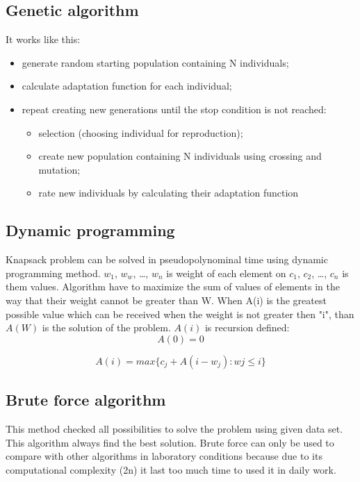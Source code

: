 \documentclass[conference,compsoc]{IEEEtran}
\begin{document}
\subsection{Genetic algorithm}
It works like this:
\begin{itemize}
\item generate random starting population containing N individuals;
\item calculate adaptation function for each individual;
\item repeat creating new generations until the stop condition is not reached:
	\begin{itemize}
	\item selection (choosing individual for reproduction);
	\item create new population containing N individuals 					using crossing and mutation;
	\item rate new individuals by calculating their 						adaptation function
	\end{itemize}
	

\end{itemize}
\subsection{Dynamic programming}
Knapsack problem can be solved in pseudopolynominal time using dynamic programming method. $w_{1}$, $w_{w}$, …, $w_{n}$ is weight of each element on $c_{1}$, $c_{2}$, …, $c_{n}$ is them values. Algorithm have to maximize the sum of values of elements in the way that their weight cannot be greater than W. When A(i) is the greatest possible value which can be received when the weight is not greater then "i", than $A(W)$ is the solution of the problem.
$A(i)$ is recursion defined:\\
\begin{equation}
A(0) = 0
\end{equation}

\begin{equation}
A(i) = max \{c_{j} + A(i-w_{j}): w{j}\leqslant i\}
\end{equation}




\subsection{Brute force algorithm}
This method checked all possibilities to solve the problem using given data set. This algorithm always find the best solution. Brute force can only be used to compare with other algorithms in laboratory conditions because due to its computational complexity (2n) it last too much time to used it in daily work. 
\end{document}
